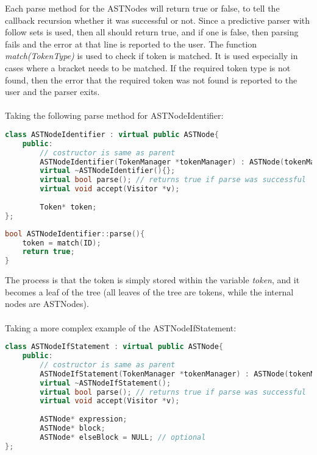 Each parse method for the ASTNodes will return true or false, to tell the callback recursion whether it was successful or not. Since a predictive parser with follow sets is used, then all should return true, and if one is false, then parsing fails and the error at that line is reported to the user. The function \textit{match(TokenType)} is used to check if  token is matched. It is used especially in cases where a bracket needs to be matched. If the required token type is not found, then the error that the required token was not found is reported to the user and the parser exits.
\\ \\
Taking the following parse method for ASTNodeIdentifier:
\begin{lstlisting}[language=C++]
class ASTNodeIdentifier : virtual public ASTNode{
	public:
		// costructor is same as parent
		ASTNodeIdentifier(TokenManager *tokenManager) : ASTNode(tokenManager) {};
		virtual ~ASTNodeIdentifier(){};
		virtual bool parse(); // returns true if parse was successful
		virtual void accept(Visitor *v);
		
		Token* token;
};
\end{lstlisting}

\begin{lstlisting}[language=C++]
bool ASTNodeIdentifier::parse(){
	token = match(ID);
	return true;
}
\end{lstlisting}
The process is that the token is simply stored within the variable \textit{token}, and it becomes a leaf of the tree (all leaves of the tree are tokens, while the internal nodes are ASTNodes).
\\\\
Taking a more complex example of the ASTNodeIfStatement:
\begin{lstlisting}[language=C++]
class ASTNodeIfStatement : virtual public ASTNode{
	public:
		// costructor is same as parent
		ASTNodeIfStatement(TokenManager *tokenManager) : ASTNode(tokenManager) {};
		virtual ~ASTNodeIfStatement();
		virtual bool parse(); // returns true if parse was successful
		virtual void accept(Visitor *v);
		
		ASTNode* expression;
		ASTNode* block;
		ASTNode* elseBlock = NULL; // optional
};
\end{lstlisting}

